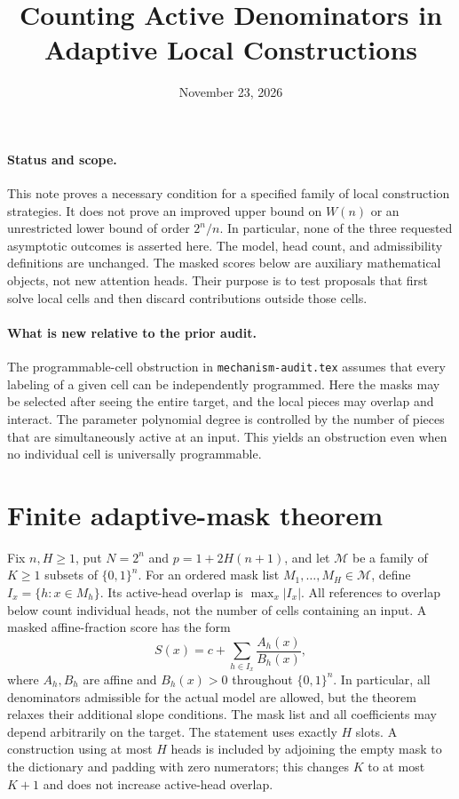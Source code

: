 \documentclass[11pt]{article}
\newcommand{\Qn}{\{0,1\}^n}
\begin{document}
\title{Counting Active Denominators in Adaptive Local Constructions}
\author{}
\date{November 23, 2026}
\maketitle

\paragraph{Status and scope.}
This note proves a necessary condition for a specified family of local
construction strategies. It does not prove an improved upper bound on
$W(n)$ or an unrestricted lower bound of order $2^n/n$. In particular,
none of the three requested asymptotic outcomes is asserted here.
The model, head count, and admissibility definitions are unchanged.
The masked scores below are auxiliary mathematical objects, not new
attention heads. Their purpose is to test proposals that first solve
local cells and then discard contributions outside those cells.

\paragraph{What is new relative to the prior audit.}
The programmable-cell obstruction in \texttt{mechanism-audit.tex}
assumes that every labeling of a given cell can be independently
programmed. Here the masks may be selected after seeing the entire
target, and the local pieces may overlap and interact. The parameter
polynomial degree is controlled by the number of pieces that are
simultaneously active at an input. This yields an obstruction even
when no individual cell is universally programmable.

\section{Finite adaptive-mask theorem}

Fix $n,H\geq1$, put $N=2^n$ and $p=1+2H(n+1)$, and let
$\mathcal M$ be a family of $K\geq1$ subsets of $\Qn$.
For an ordered mask list $M_1,\ldots,M_H\in\mathcal M$, define
$I_x=\{h:x\in M_h\}$. Its active-head overlap is
$\max_x|I_x|$. All references to overlap below count individual heads,
not the number of cells containing an input. A masked affine-fraction score has the form
\[
 S(x)=c+\sum_{h\in I_x}\frac{A_h(x)}{B_h(x)},
\]
where $A_h,B_h$ are affine and $B_h(x)>0$ throughout $\Qn$.
In particular, all denominators admissible for the actual model are
allowed, but the theorem relaxes their additional slope conditions.
The mask list and all coefficients may depend arbitrarily on the target.
The statement uses exactly $H$ slots. A construction using at most
$H$ heads is included by adjoining the empty mask to the dictionary
and padding with zero numerators; this changes $K$ to at most $K+1$
and does not increase active-head overlap.
\end{document}
